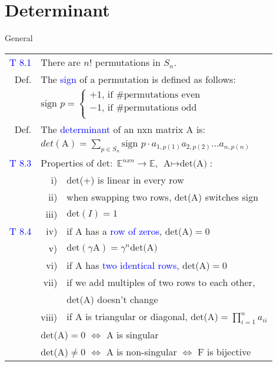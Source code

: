 \section{Determinant}
\begin{mainbox}{General}
\setlength{\tabcolsep}{2pt}
\begin{tabular}{rrl}
	\textcolor{blue}{T 8.1} & \multicolumn{2}{l}{There are $n!$ permutations in $S_n$.}\\
	\rule{0pt}{3ex}	
	Def. & \multicolumn{2}{l}{The \textcolor{blue}{sign} of a permutation is defined as follows:}\\
	& \multicolumn{2}{l}{$\text{sign }p = \begin{cases}
        +1\text{, if \#permutations even}\\
        -1\text{, if \#permutations odd}\\
    \end{cases}$}\\
    \rule{0pt}{3ex}
    Def. & \multicolumn{2}{l}{The \textcolor{blue}{determinant} of an nxn matrix A is:}\\
    & \multicolumn{2}{l}{$det(\text{A}) = \displaystyle\sum_{p\in S_n}\text{sign }p\cdot a_{1,p(1)}a_{2,p(2)} \ldots a_{n,p(n)}$}\\
    \rule{0pt}{3ex}
    \textcolor{blue}{T 8.3} & \multicolumn{2}{l}{Properties of $\text{det}:\;\mathbb{E}^{nxn}\rightarrow\mathbb{E}$, $\text{A}\mapsto \text{det(A)}$:}\\
    & i) & det(+) is linear in every row\\
    & ii) & when swapping two rows, det(A) switches sign\\
    & iii) & $\text{det}(I) = 1$\\
    \textcolor{blue}{T 8.4} & iv) & if A has a \textcolor{blue}{row of zeros}, det(A)$= 0$\\
    & v) & $\text{det}(\gamma \text{A}) = \gamma ^n \text{det(A)}$\\
    & vi) & if A has \textcolor{blue}{two identical rows}, det(A)$= 0$\\
    & vii) & if we add multiples of two rows to each other,\\
    & & det(A) doesn't change\\
    & viii) & if A is triangular or diagonal, det(A)$=\displaystyle\prod_{i=1}^n a_{ii}$\\
	\rule{0pt}{3ex}
	& \multicolumn{2}{l}{det(A)$= 0$ $\Leftrightarrow$ A is singular}\\
	& \multicolumn{2}{l}{det(A)$\neq 0$ $\Leftrightarrow$ A is non-singular $\Leftrightarrow$ F is bijective}\\

\end{tabular}
\end{mainbox}
